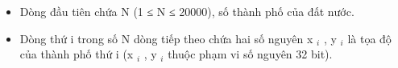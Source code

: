 \begin{itemize}
	\item Dòng đầu tiên chứa N (1 ≤ N ≤ 20000), số thành phố của đất nước.
	\item Dòng thứ i trong số N dòng tiếp theo chứa hai số nguyên x $_ i $ , y $_ i $ là tọa độ của thành phố thứ i (x $_ i $ , y $_ i $ thuộc phạm vi số nguyên 32 bit).
\end{itemize}

\